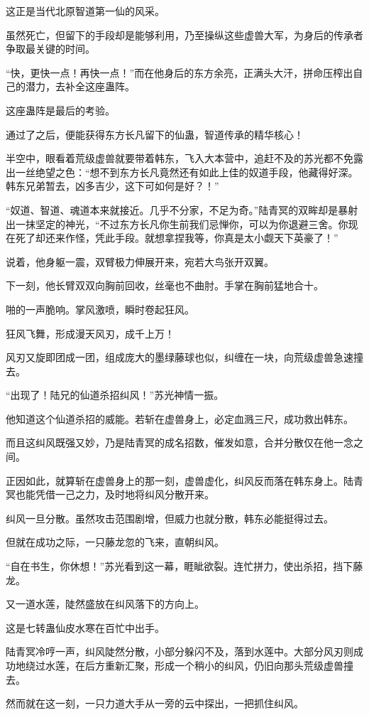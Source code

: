 \begin{this_body}
这正是当代北原智道第一仙的风采。

虽然死亡，但留下的手段却是能够利用，乃至操纵这些虚兽大军，为身后的传承者争取最关键的时间。

“快，更快一点！再快一点！”而在他身后的东方余亮，正满头大汗，拼命压榨出自己的潜力，去补全这座蛊阵。

这座蛊阵是最后的考验。

通过了之后，便能获得东方长凡留下的仙蛊，智道传承的精华核心！

半空中，眼看着荒级虚兽就要带着韩东，飞入大本营中，追赶不及的苏光都不免露出一丝绝望之色：“想不到东方长凡竟然还有如此上佳的奴道手段，他藏得好深。韩东兄弟暂去，凶多吉少，这下可如何是好？！”

“奴道、智道、魂道本来就接近。几乎不分家，不足为奇。”陆青冥的双眸却是暴射出一抹坚定的神光，“不过东方长凡你生前我们忌惮你，可以为你退避三舍。你现在死了却还来作怪，凭此手段。就想拿捏我等，你真是太小觑天下英豪了！”

说着，他身躯一震，双臂极力伸展开来，宛若大鸟张开双翼。

下一刻，他长臂双双向胸前回收，丝毫也不曲肘。手掌在胸前猛地合十。

啪的一声脆响。掌风激喷，瞬时卷起狂风。

狂风飞舞，形成漫天风刃，成千上万！

风刃又旋即团成一团，组成庞大的墨绿藤球也似，纠缠在一块，向荒级虚兽急速撞去。

“出现了！陆兄的仙道杀招纠风！”苏光神情一振。

他知道这个仙道杀招的威能。若斩在虚兽身上，必定血溅三尺，成功救出韩东。

而且这纠风既强又妙，乃是陆青冥的成名招数，催发如意，合并分散仅在他一念之间。

正因如此，就算斩在虚兽身上的那一刻，虚兽虚化，纠风反而落在韩东身上。陆青冥也能凭借一己之力，及时地将纠风分散开来。

纠风一旦分散。虽然攻击范围剧增，但威力也就分散，韩东必能挺得过去。

但就在成功之际，一只藤龙忽的飞来，直朝纠风。

“自在书生，你休想！”苏光看到这一幕，睚眦欲裂。连忙拼力，使出杀招，挡下藤龙。

又一道水莲，陡然盛放在纠风落下的方向上。

这是七转蛊仙皮水寒在百忙中出手。

陆青冥冷哼一声，纠风陡然分散，小部分躲闪不及，落到水莲中。大部分风刃则成功地绕过水莲，在后方重新汇聚，形成一个稍小的纠风，仍旧向那头荒级虚兽撞去。

然而就在这一刻，一只力道大手从一旁的云中探出，一把抓住纠风。


\end{this_body}
